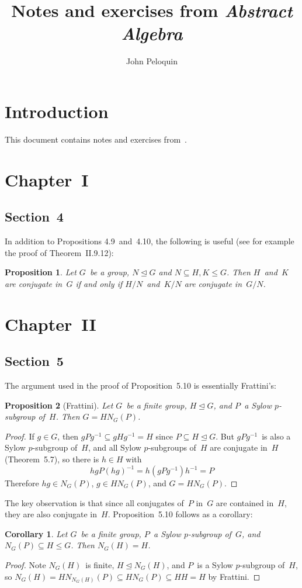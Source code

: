 \documentclass[letterpaper,12pt]{article}
\title{Notes and exercises from \textit{Abstract Algebra}}
\author{John Peloquin}
\date{}
\newcommand{\subgroupeq}{\le}
\newcommand{\nsubgroupeq}{\trianglelefteq}
\theoremstyle{definition}
\theoremstyle{remark}
\theoremstyle{plain}
\newtheorem*{prop}{Proposition}
\newtheorem*{cor}{Corollary}
\begin{document}
\maketitle

\section*{Introduction}
This document contains notes and exercises from~\cite{grillet}.

\section*{Chapter~I}
\subsection*{Section~4}
In addition to Propositions 4.9~and~4.10, the following is useful (see for example the proof of Theorem~II.9.12):
\begin{prop}
Let \(G\)~be a group, \(N\nsubgroupeq G\) and \(N\subseteq H,K\subgroupeq G\). Then \(H\)~and~\(K\) are conjugate in~\(G\) if and only if \(H/N\)~and~\(K/N\) are conjugate in~\(G/N\).
\end{prop}

\section*{Chapter~II}
\subsection*{Section~5}

The argument used in the proof of Proposition~5.10 is essentially Frattini's:
\begin{prop}[Frattini]
Let \(G\)~be a finite group, \(H\nsubgroupeq G\), and \(P\)~a Sylow \(p\)-subgroup of~\(H\). Then \(G=HN_G(P)\).
\end{prop}
\begin{proof}
If \(g\in G\), then \(gPg^{-1}\subseteq gHg^{-1}=H\) since \(P\subseteq H\nsubgroupeq G\). But \(gPg^{-1}\)~is also a Sylow \(p\)-subgroup of~\(H\), and all Sylow \(p\)-subgroups of~\(H\) are conjugate in~\(H\) (Theorem~5.7), so there is \(h\in H\) with
\[hgP(hg)^{-1}=h(gPg^{-1})h^{-1}=P\]
Therefore \(hg\in N_G(P)\), \(g\in HN_G(P)\), and \(G=HN_G(P)\).
\end{proof}
\noindent The key observation is that since all conjugates of~\(P\) in~\(G\) are contained in~\(H\), they are also conjugate in~\(H\). Proposition~5.10 follows as a corollary:
\begin{cor}
Let \(G\)~be a finite group, \(P\)~a Sylow \(p\)-subgroup of~\(G\), and \(N_G(P)\subseteq H\subgroupeq G\). Then \(N_G(H)=H\).
\end{cor}
\begin{proof}
Note \(N_G(H)\)~is finite, \(H\nsubgroupeq N_G(H)\), and \(P\)~is a Sylow \(p\)-subgroup of~\(H\), so \(N_G(H)=HN_{N_G(H)}(P)\subseteq HN_G(P)\subseteq HH=H\) by Frattini.
\end{proof}
\end{document}
